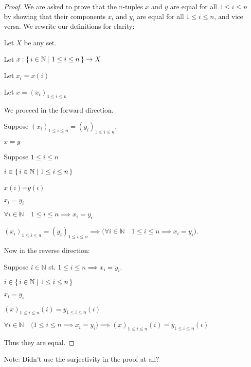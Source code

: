 \documentclass[../../main.tex]{subfiles}
\begin{document}
\begin{proof}
    We are asked to prove that the n-tuples $x$ and $y$ are equal for all $1 \leq i \leq n$ by showing that their components $x_i$ and $y_i$ are equal for all  $1 \leq i \leq n$, and vice versa. We rewrite our definitions for clarity:
    \begin{lxl}
        \item Let $X$ be any set. 
        \item Let $x : \{\,i \in \mathbb{N}\mid1 \leq i \leq n\,\} \to X$
        \item Let $x_i = x(i)$ 
        \item Let $x = (x_i)_{1 \leq i \leq n}$
    \end{lxl}
    We proceed in the forward direction.
    \begin{lxl}[resume]
        \item Suppose $(x_i)_{1 \leq i \leq n} = (y_i)_{1 \leq i \leq n}$.
        \begin{lxl}
            \item $x = y$ 
            \item Suppose ${1 \leq i \leq n}$
            \begin{lxl}
                \item $i \in \{\,i \in \mathbb{N}\mid1 \leq i \leq n\,\}$
                \item $x(i)$=$y(i)$ 
                \item $x_i=y_i$ 
            \end{lxl}
            \item $\forall i \in \mathbb{N} \quad {1 {\leq} i {\leq} n} \implies x_i=y_i$
        \end{lxl}
        \item $(x_i)_{1 \leq i \leq n} = (y_i)_{1 \leq i \leq n} \implies \bigl( \forall i \in \mathbb{N} \quad {1 {\leq} i {\leq} n} \implies x_i=y_i \bigr)$.
    \end{lxl}
    Now in the reverse direction:
    \begin{lxl}[resume]
        \item Suppose $i \in \mathbb{N}$ st. ${1 {\leq} i {\leq} n} \implies x_i=y_i$.
        \begin{lxl}
            \item $i \in \{\,i \in \mathbb{N}\mid1 \leq i \leq n\,\}$ 
            \item $x_i=y_i$ 
            \item $(x)_{1 \leq i \leq n}(i)=y_{1 \leq i \leq n}(i)$ 
        \end{lxl}
        \item $\forall i \in \mathbb{N} \quad \bigl({1 {\leq} i {\leq} n} \implies x_i=y_i \bigr) \implies (x)_{1 \leq i \leq n}(i)=y_{1 \leq i \leq n}(i)$ 
    \end{lxl}\item
    Thus they are equal.
\end{proof}
\begin{xx}
    Note: Didn't use the surjectivity in the proof at all?
\end{xx}
\end{document}
